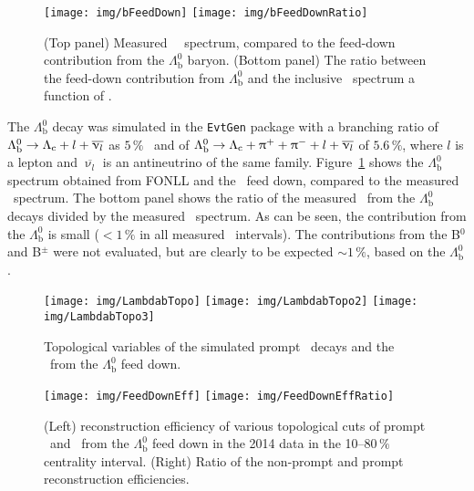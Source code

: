 \begin{figure}[!htb]
\centering
\texttt{[image: img/bFeedDown]}
\texttt{[image: img/bFeedDownRatio]}
\caption[Measured \Lambdacpm\ \pt\ spectrum, compared to the feed-down contribution from the $\Lambda_\mathrm{b}^0$ baryon. The ratio between the feed-down contribution from $\Lambda_\mathrm{b}^0$ and the inclusive \Lambdacpm\ spectrum.]{\label{bFeedDown} (Top panel) Measured \Lambdacpm\ \pt\ spectrum, compared to the feed-down contribution from the $\Lambda_\mathrm{b}^0$ baryon. (Bottom panel) The ratio between the feed-down contribution from $\Lambda_\mathrm{b}^0$ and the inclusive \Lambdacpm\ spectrum a function of \pt.}
\end{figure}

The $\Lambda_\mathrm{b}^0$ decay was simulated in the \texttt{EvtGen} package with a branching ratio of $\Lambda_\mathrm{b}^0 \rightarrow {\Lambda_\text{c}} + l + \overline{\upnu_l}$ as $5\,\%$~\cite{PDG} and of $\Lambda_\mathrm{b}^0 \rightarrow {\Lambda_\text{c}} + \uppi^+ + \uppi^- + l + \overline{\upnu_l}$ of $5.6\,\%$, where $l$ is a lepton and $\overline{\upnu_l}$ is an antineutrino of the same family. Figure~\ref{bFeedDown} shows the $\Lambda_\mathrm{b}^0$ spectrum obtained from FONLL and the \Lambdac\ feed down, compared to the measured \Lambdac\ spectrum. The bottom panel shows the ratio of the measured \Lambdac\ from the  $\Lambda_\mathrm{b}^0$ decays divided by the measured \pt\ spectrum. As can be seen, the contribution  from the $\Lambda_\mathrm{b}^0$ is small ($< 1\,\%$ in all measured \pt\ intervals)\@. The contributions from the B$^0$ and B$^\pm$ were not evaluated, but are clearly to be expected $\sim1\,\%$, based on the $\Lambda_\mathrm{b}^0$\@.

\begin{figure}[!htb]
\centering
\texttt{[image: img/LambdabTopo]}
\texttt{[image: img/LambdabTopo2]}
\texttt{[image: img/LambdabTopo3]}
\caption[Topological variables of the simulated prompt and non-prompt \Lambdac\ decays.]{\label{LambdabTopo} Topological variables of the simulated prompt \Lambdac\ decays and the \Lambdac\ from the $\Lambda_\mathrm{b}^0$ feed down.}
\end{figure}

\begin{figure}[!htb]
\centering
\texttt{[image: img/FeedDownEff]}
\texttt{[image: img/FeedDownEffRatio]}
\caption[Reconstruction efficiency of various topological cuts of prompt and non-prompt \Lambdac\ for 2014.]{\label{FeedDownEff} (Left) reconstruction efficiency of various topological cuts of prompt \Lambdac\ and \Lambdac\ from the $\Lambda_\mathrm{b}^0$ feed down in the 2014 data in the 10--80$\,\%$ centrality interval. (Right) Ratio of the non-prompt and prompt reconstruction efficiencies.}
\end{figure}

